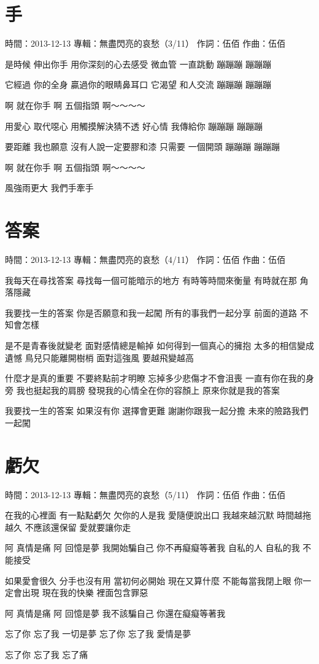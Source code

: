 \documentclass[UTF8,a4paper,oneside,twocolumn,12pt]{ctexbook}
\newcommand{\infopair}[2]{\textbullet #1：#2}
\newcommand{\zc}[1][伍佰]{\infopair{作詞}{#1}}
\newcommand{\zq}[1][伍佰]{\infopair{作曲}{#1}}
\newcommand{\zj}[1]{\infopair{專輯}{#1}}
\newcommand{\sj}[1]{\infopair{時間}{#1}}
\newenvironment{info}{\begin{flushleft}\kaishu
	}
	{\end{flushleft}\normalsize\yahei\par}
\newenvironment{lyric}{
	}
{}
\begin{document}
\section{手}
\begin{info}
	\sj{2013-12-13}
	\zj{無盡閃亮的哀愁（3/11）}
	\zc
	\zq
\end{info}
\begin{lyric}
	是時候 伸出你手
	用你深刻的心去感受
	微血管 一直跳動
	蹦蹦蹦 蹦蹦蹦

	它經過 你的全身
	贏過你的眼睛鼻耳口
	它渴望 和人交流
	蹦蹦蹦 蹦蹦蹦

	啊 就在你手
	啊 五個指頭
	啊～～～～

	用愛心 取代噁心
	用觸摸解決猜不透
	好心情 我傳給你
	蹦蹦蹦 蹦蹦蹦

	要距離 我也願意
	沒有人說一定要膠和漆
	只需要 一個開頭
	蹦蹦蹦 蹦蹦蹦

	啊 就在你手
	啊 五個指頭
	啊～～～～

	風強雨更大
	我們手牽手
\end{lyric}

\section{答案}
\begin{info}
	\sj{2013-12-13}
	\zj{無盡閃亮的哀愁（4/11）}
	\zc
	\zq
\end{info}
\begin{lyric}
	我每天在尋找答案
	尋找每一個可能暗示的地方
	有時等時間來衡量
	有時就在那 角落隱藏

	我要找一生的答案
	你是否願意和我一起闖
	所有的事我們一起分享
	前面的道路 不知會怎樣

	是不是青春後就變老 面對感情總是輸掉
	如何得到一個真心的擁抱
	太多的相信變成遺憾 鳥兒只能離開樹梢
	面對這強風 要越飛變越高

	什麼才是真的重要 不要終點前才明瞭
	忘掉多少悲傷才不會沮喪
	一直有你在我的身旁 我也挺起我的肩膀
	發現我的心情全在你的容顏上
	原來你就是我的答案

	我要找一生的答案
	如果沒有你 選擇會更難
	謝謝你跟我一起分擔
	未來的險路我們一起闖
\end{lyric}

\section{虧欠}
\begin{info}
	\sj{2013-12-13}
	\zj{無盡閃亮的哀愁（5/11）}
	\zc
	\zq
\end{info}
\begin{lyric}
	在我的心裡面 有一點點虧欠
	欠你的人是我 愛隨便說出口
	我越來越沉默 時間越拖越久
	不應該還保留 愛就要讓你走

	阿 真情是痛
	阿 回憶是夢
	我開始騙自己 你不再癡癡等著我
	自私的人 自私的我 不能接受

	如果愛會很久 分手也沒有用
	當初何必開始 現在又算什麼
	不能每當我閉上眼 你一定會出現
	現在我的快樂 裡面包含罪惡

	阿 真情是痛
	阿 回憶是夢
	我不該騙自己 你還在癡癡等著我

	忘了你 忘了我 一切是夢
	忘了你 忘了我 愛情是夢

	忘了你 忘了我 忘了痛
\end{lyric}
\end{document}
